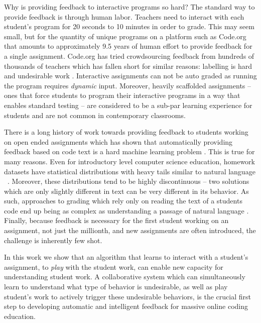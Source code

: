 \documentclass{article}
\begin{document}
Why is providing feedback to interactive programs so hard? The standard way to provide feedback is through human labor. Teachers need to interact with each student’s program for 20 seconds to 10 minutes in order to grade. This may seem small, but for the quantity of unique programs on a platform such as Code.org that amounts to approximately 9.5 years of human effort to provide feedback for a single assignment. Code.org has tried crowdsourcing feedback from hundreds of thousands of teachers which has fallen short for similar reasons: labelling is hard and undesirable work \cite{codehints}. 
Interactive assignments can not be auto graded as running the program requires \emph{dynamic} input. Moreover, heavily scaffolded assignments -- ones that force students to program their interactive programs in a way that enables standard testing -- are considered to be a sub-par learning experience for students and are not common in contemporary classrooms.

There is a long history of work towards providing feedback to students working on open ended assignments which has shown that automatically providing feedback based on code text is a hard machine learning problem \citep{piech2015deep,basu2013powergrading,yan_pyramid,wang2017learning,liu2019automated,hu2019reliable}. This is true for many reasons. 
Even for introductory level computer science education, homework datasets have statistical distributions with heavy tails similar to natural language ~\citep{wu2019zero}. Moreover, these distributions tend to be highly discontinuous -- two solutions which are only slightly different in text can be very different in its behavior. As such, approaches to grading which rely only on reading the text of a students code end up being as complex as understanding a passage of natural language \cite{malik2021generative}. Finally, because feedback is necessary for the first student working on an assignment, not just the millionth, and new assignments are often introduced, the challenge is inherently few shot.

In this work we show that an algorithm that learns to interact with a student's assignment, to \emph{play} with the student work, can enable new capacity for understanding student work. A collaborative system which can simultaneously learn to understand what type of behavior is undesirable, as well as play student's work to actively trigger these undesirable behaviors, is the crucial first step to developing automatic and intelligent feedback for massive online coding education.
\end{document}
